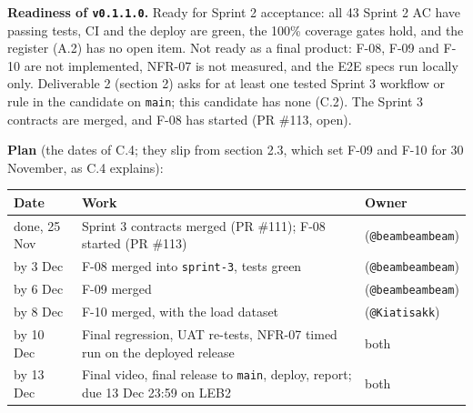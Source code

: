 \label{E:3}

\textbf{Readiness of \texttt{v0.1.1.0}.} Ready for Sprint 2 acceptance: all 43 Sprint 2 AC have passing tests, CI and the deploy are green, the 100\% coverage gates hold, and the register (A.2) has no open item. Not ready as a final product: F-08, F-09 and F-10 are not implemented, NFR-07 is not measured, and the E2E specs run locally only. Deliverable 2 (section 2) asks for at least one tested Sprint 3 workflow or rule in the candidate on \texttt{main}; this candidate has none (C.2). The Sprint 3 contracts are merged, and F-08 has started (PR \#113, open).

\textbf{Plan} (the dates of C.4; they slip from  section 2.3, which set F-09 and F-10 for 30 November, as C.4 explains):

\begin{center}\small\setlength{\tabcolsep}{4pt}
\begin{tabular}{@{}p{3.0cm}p{8.2cm}p{4.6cm}@{}}
\toprule \textbf{Date} & \textbf{Work} & \textbf{Owner} \\ \midrule
done, 25 Nov & Sprint 3 contracts merged (PR \#111); F-08 started (PR \#113) & \studentTwoName{} (\texttt{@beambeambeam}) \\
by 3 Dec & F-08 merged into \texttt{sprint-3}, tests green & \studentTwoName{} (\texttt{@beambeambeam}) \\
by 6 Dec & F-09 merged & \studentTwoName{} (\texttt{@beambeambeam}) \\
by 8 Dec & F-10 merged, with the load dataset & \studentOneName{} (\texttt{@Kiatisakk}) \\
by 10 Dec & Final regression, UAT re-tests, NFR-07 timed run on the deployed release & both \\
by 13 Dec & Final video, final release to \texttt{main}, deploy, report; due 13 Dec 23:59 on LEB2 & both \\
\bottomrule
\end{tabular}
\end{center}
